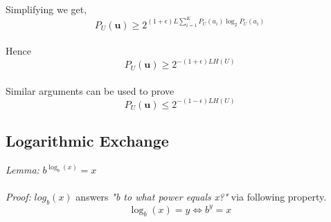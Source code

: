 \documentclass[11pt]{article}
\begin{document}
Simplifying we get,
\begin{equation}
P_{U}(\textbf{u}) \geq 2^{(1+\epsilon) L \sum\limits_{i=1}^KP_{U}(a_{i})\log_{2}P_{U}(a_{i})}
\end{equation}
\\

Hence
\begin{equation}
P_{U}(\textbf{u}) \geq 2^{-(1+\epsilon)LH(U)}
\end{equation}
\\

Similar arguments can be used to prove
\begin{equation}
P_{U}(\textbf{u}) \leq 2^{-(1-\epsilon)LH(U)}
\end{equation}

\subsection{Logarithmic Exchange} 
\textit{Lemma:} $b^{\log_{b}(x)} = x$
\\ \\
\textit{Proof:} $log_{b}(x)$ answers \textit{"b to what power equals x?"} via following property.
\begin{equation}
\log_{b}(x) = y \Leftrightarrow b^{y} = x
\end{equation}
\end{document}
